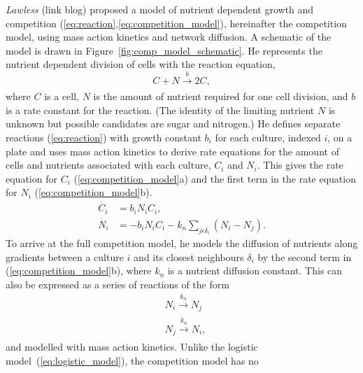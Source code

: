 \textit{Lawless} (link blog) proposed a model of nutrient dependent
growth and competition (\ref{eq:reaction},\ref{eq:competition_model}),
hereinafter the competition model, using mass action kinetics and
network diffusion. A schematic of the model is drawn in
Figure~\ref{fig:comp_model_schematic}. He represents the nutrient
dependent division of cells with the reaction equation,
\begin{equation}
  \label{eq:reaction}
    C + N \xrightarrow[]{b} 2C,
\end{equation}
where \(C\) is a cell, \(N\) is the amount of nutrient required for
one cell division, and \(b\) is a rate constant for the reaction. (The
identity of the limiting nutrient \(N\) is unknown but possible
candidates are sugar and nitrogen.) He defines separate reactions
(\ref{eq:reaction}) with growth constant \(b_{i}\) for each culture,
indexed \(i\), on a plate and uses mass action kinetics to derive rate
equations for the amount of cells and nutrients associated with each
culture, \(C_{i}\) and \(N_{i}\). This gives the rate equation for
\(C_{i}\) (\ref{eq:competition_model}a) and the first term in the rate
equation for \(N_{i}\) (\ref{eq:competition_model}b).
\begin{subequations}
  \label{eq:competition_model}
  \begin{align}
    \dot{C_{i}}& = b_{i}N_{i}C_{i},\\
    \dot{N_{i}}& = - b_{i}N_{i}C_{i} - k_{n}\sum_{j \epsilon \delta_i}(N_{i} - N_{j}).
  \end{align}
\end{subequations}
To arrive at the full competition model, he models the diffusion of
nutrients along gradients between a culture \(i\) and its closest
neighbours \(\delta_{i}\) by the second term in
(\ref{eq:competition_model}b), where \(k_{n}\) is a nutrient diffusion
constant. This can also be expressed as a series of reactions of the
form
\begin{subequations}
  \label{eq:diffusion_reaction}
  \begin{align}
  &N_{i} \xrightarrow[]{k_{n}} N_{j}\\
  &N_{j} \xrightarrow[]{k_{n}} N_{i},
  \end{align}
\end{subequations}
and modelled with mass action kinetics. Unlike the logistic
model~(\ref{eq:logistic_model}), the competition model has no
